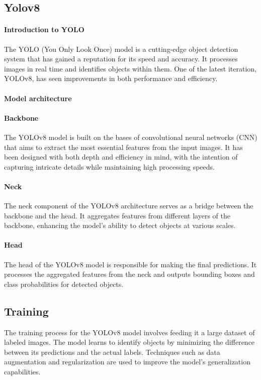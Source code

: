 \documentclass[11pt,a4paper,twoside,openright]{report}  %
\begin{document}
\subsection{Yolov8}\label{subsec:yolov8}

\paragraph{Introduction to YOLO}\label{par:introduction-to-yolo}
The YOLO (You Only Look Once) model is a cutting-edge object detection system that has gained a reputation for
its speed and accuracy.
It processes images in real time and identifies objects within them.
One of the latest iteration, YOLOv8, has seen improvements in both performance and efficiency.
\paragraph{Model architecture}\label{par:architecture}

\paragraph{Backbone}\label{par:backbone}
The YOLOv8 model is built on the bases of convolutional neural networks (CNN) that aims to extract the most essential features from the input images.
It has been designed with both depth and efficiency in mind, with the intention of capturing intricate details while maintaining high processing speeds.
\paragraph{Neck}\label{par:neck}
The neck component of the YOLOv8 architecture serves as a bridge between the backbone and the head.
It aggregates features from different layers of the backbone, enhancing the model's ability to detect objects at various scales.
\paragraph{Head}\label{par:head}
The head of the YOLOv8 model is responsible for making the final predictions.
It processes the aggregated features from the neck and outputs bounding boxes and class probabilities for detected objects.

\subsection{Training}\label{subsec:training}
The training process for the YOLOv8 model involves feeding it a large dataset of labeled images.
The model learns to identify objects by minimizing the difference between its predictions and the actual labels.
Techniques such as data augmentation and regularization are used to improve the model's generalization capabilities.
\end{document}
